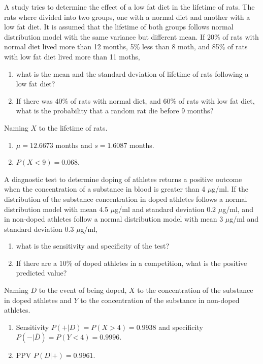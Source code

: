 {A study tries to determine the effect of a low fat diet in the lifetime of rats.
The rats where divided into two groups, one with a normal diet and another with a low fat diet.
It is assumed that the lifetime of both groups follows normal distribution model with the same variance but different
mean.
If 20\% of rats with normal diet lived more than 12 months, 5\% less than 8 moth, and 85\% of rats with low fat diet
lived more than 11 moths,
\begin{enumerate}
\item what is the mean and the standard deviation of lifetime of rats following a low fat diet?
\item If there was 40\% of rats with normal diet, and 60\% of rats with low fat diet, what is the probability that a
random rat die before 9 months?
\end{enumerate}
}
{Naming $X$ to the lifetime of rats.
\begin{enumerate}
\item $\mu=12.6673$ months and $s=1.6087$ months.
\item $P(X<9)=0.068$.
\end{enumerate}
}
{}


{A diagnostic test to determine doping of athletes returns a positive outcome when the concentration of a substance
in blood is greater than 4 $\mu$g/ml.
If the distribution of the substance concentration in doped athletes follows a normal distribution model with mean $4.5$
$\mu$g/ml and standard deviation $0.2$ $\mu$g/ml, and in non-doped athletes follow a normal distribution model with mean
$3$ $\mu$g/ml and standard deviation $0.3$ $\mu$g/ml,
\begin{enumerate}
\item what is the sensitivity and specificity of the test?
\item If there are a 10\% of doped athletes in a competition, what is the positive predicted value?
\end{enumerate}
}
{Naming $D$ to the event of being doped, $X$ to the concentration of the substance in doped athletes and $Y$ to the concentration of the substance in non-doped athletes.
\begin{enumerate}
\item Sensitivity $P(+|D)=P(X>4)=0.9938$ and specificity $P(-|\overline D)=P(Y<4)=0.9996$.
\item PPV $P(D|+)=0.9961$.
\end{enumerate}
}
{}
